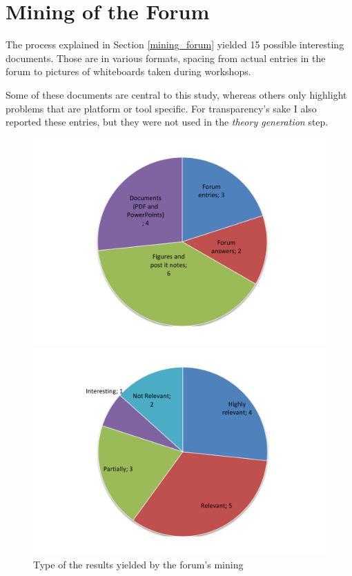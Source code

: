 \section{Mining of the Forum}
The process explained in Section \ref{mining_forum} yielded 15 possible interesting documents. Those are in various formats, spacing from actual entries in the forum to pictures of whiteboards taken during workshops.

Some of these documents are central to this study, whereas others only highlight problems that are platform or tool specific. For transparency's sake I also reported these entries, but they were not used in the \textit{theory generation} step.



\begin{figure}[ht]
    \centering
    \begin{minipage}[t]{0.45\linewidth}
        \centering
        \includegraphics[width=\textwidth]{figure/results/confluence_doc_types}
        \caption{Type of the results yielded by the forum's mining}
        \label{fig:confluence_types}
    \end{minipage}
    \hspace{0.5cm}
    \begin{minipage}[t]{0.45\linewidth}
        \centering
        \includegraphics[width=\textwidth]{figure/results/confluence_doc_relevance}

\end{minipage}
\end{figure}
